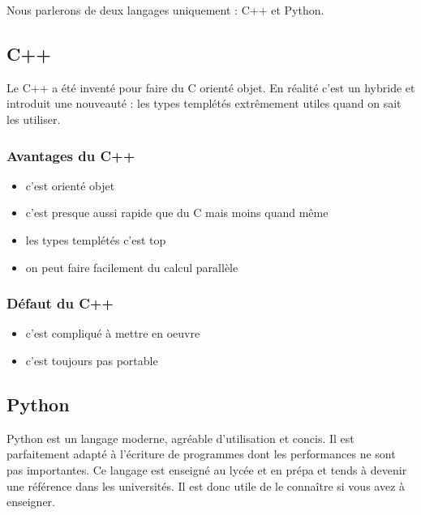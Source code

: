 Nous parlerons de deux langages uniquement : C++ et Python. 

\subsection{C++}

Le C++ a été inventé pour faire du C orienté objet. En réalité c'est un hybride et introduit une
nouveauté : les types templétés extrêmement utiles quand on sait les utiliser.


\subsubsection*{Avantages du C++}

\begin{itemize}
\item c'est orienté objet
\item c'est presque aussi rapide que du C mais moins quand même
\item les types templétés c'est top
\item on peut faire facilement du calcul parallèle %
\end{itemize}

\subsubsection*{Défaut du C++}

\begin{itemize}
\item c'est compliqué à mettre en oeuvre
\item c'est toujours pas portable %
\end{itemize}

\subsection{Python}

Python est un langage moderne, agréable d'utilisation et concis.
Il est parfaitement adapté à l'écriture de programmes dont les performances ne sont
pas importantes. Ce langage est enseigné au lycée et en prépa et tends à devenir une référence
dans les universités. Il est donc utile de le connaître si vous avez à enseigner.

